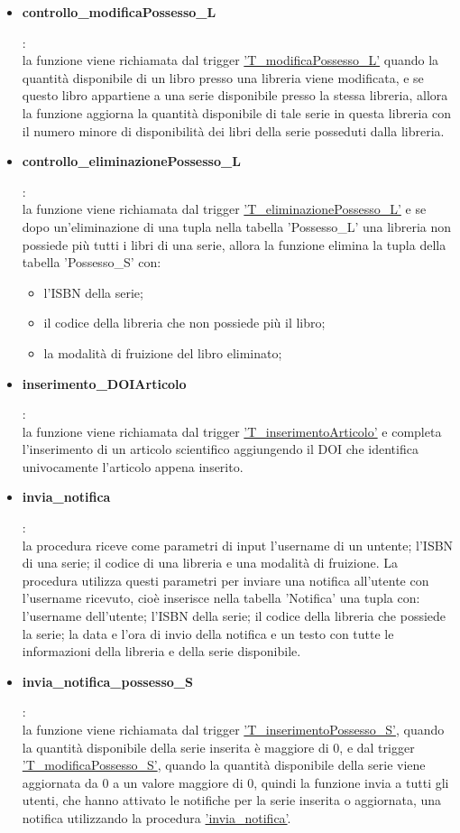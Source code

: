 \documentclass{article}
\begin{document}
\begin{itemize}
    \item \hypertarget{f19}{\textbf{controllo\_modificaPossesso\_L}}:\\
    la funzione viene richiamata dal trigger \hyperlink{t19}{'T\_modificaPossesso\_L'} quando la quantità disponibile di un libro presso una libreria viene modificata, e se questo libro appartiene a una serie disponibile presso la stessa libreria, allora la funzione aggiorna la quantità disponibile di tale serie in questa libreria con il numero minore di disponibilità dei libri della serie posseduti dalla libreria.

    \item \hypertarget{f20}{\textbf{controllo\_eliminazionePossesso\_L}}:\\
    la funzione viene richiamata dal trigger \hyperlink{t20}{'T\_eliminazionePossesso\_L'} e se dopo un'eliminazione di una tupla nella tabella 'Possesso\_L' una libreria non possiede più tutti i libri di una serie, allora la funzione elimina la tupla della tabella 'Possesso\_S' con:
    \begin{itemize}
        \item l'ISBN della serie; 
        \item il codice della libreria che non possiede più il libro; 
        \item la modalità di fruizione del libro eliminato;
    \end{itemize} 

    \item \hypertarget{f21}{\textbf{inserimento\_DOIArticolo}}:\\
    la funzione viene richiamata dal trigger \hyperlink{t21}{'T\_inserimentoArticolo'} e completa l'inserimento di un articolo scientifico aggiungendo il DOI che identifica univocamente l'articolo appena inserito.

    \item \hypertarget{p1}{\textbf{invia\_notifica}}:\\
    la procedura riceve come parametri di input l'username di un untente; l'ISBN di una serie; il codice di una libreria e una modalità di fruizione. La procedura utilizza questi parametri per inviare una notifica all'utente con l'username ricevuto, cioè inserisce nella tabella 'Notifica' una tupla con: l'username dell'utente; l'ISBN della serie; il codice della libreria che possiede la serie; la data e l'ora di invio della notifica e un testo con tutte le informazioni della libreria e della serie disponibile. 

    \item \hypertarget{f22}{\textbf{invia\_notifica\_possesso\_S}}:\\
    la funzione viene richiamata dal trigger \hyperlink{t22}{'T\_inserimentoPossesso\_S'}, quando la quantità disponibile della serie inserita è maggiore di 0, e dal trigger \hyperlink{t23}{'T\_modificaPossesso\_S'}, quando la quantità disponibile della serie viene aggiornata da 0 a un valore maggiore di 0, quindi la funzione invia a tutti gli utenti, che hanno attivato le notifiche per la serie inserita o aggiornata, una notifica utilizzando la procedura  \hyperlink{p1}{'invia\_notifica'}.


\end{itemize}
\end{document}
